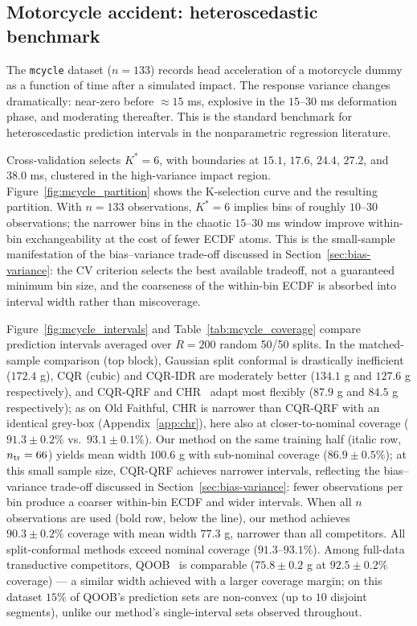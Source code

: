 \documentclass[11pt]{article}
\begin{document}
\subsection{Motorcycle accident: heteroscedastic benchmark}

The \texttt{mcycle} dataset ($n = 133$) records head acceleration of a
motorcycle dummy as a function of time after a simulated impact.
The response variance changes dramatically: near-zero before
$\approx 15$ ms, explosive in the $15$--$30$ ms deformation phase,
and moderating thereafter.
This is the standard benchmark for heteroscedastic prediction intervals
in the nonparametric regression literature.

Cross-validation selects $K^* = 6$, with boundaries at $15.1$, $17.6$,
$24.4$, $27.2$, and $38.0$ ms, clustered in the high-variance impact region.
Figure~\ref{fig:mcycle_partition} shows the K-selection curve and the
resulting partition.
With $n = 133$ observations, $K^* = 6$ implies bins of roughly
$10$--$30$ observations; the narrower bins in the chaotic $15$--$30$ ms
window improve within-bin exchangeability at the cost of fewer ECDF atoms.
This is the small-sample manifestation of the bias--variance trade-off
discussed in Section~\ref{sec:bias-variance}: the CV criterion selects
the best available tradeoff, not a guaranteed minimum bin size, and the
coarseness of the within-bin ECDF is absorbed into interval width rather
than miscoverage.

Figure~\ref{fig:mcycle_intervals} and Table~\ref{tab:mcycle_coverage}
compare prediction intervals averaged over $R=200$ random 50/50 splits.
In the matched-sample comparison (top block), Gaussian split conformal is
drastically inefficient ($172.4$ g), CQR (cubic) and CQR-IDR are moderately
better ($134.1$ g and $127.6$ g respectively), and CQR-QRF and
CHR~\citep{SesiaRomano2021} adapt most flexibly ($87.9$ g and $84.5$ g
respectively); as on Old Faithful, CHR is narrower than CQR-QRF with an
identical grey-box (Appendix~\ref{app:chr}), here also at closer-to-nominal
coverage ($91.3 \pm 0.2\%$ vs.\ $93.1 \pm 0.1\%$).
Our method on the same training half (italic row, $n_{\rm tr} = 66$)
yields mean width $100.6$ g with sub-nominal coverage ($86.9 \pm 0.5\%$);
at this small sample size, CQR-QRF achieves narrower intervals, reflecting
the bias--variance trade-off discussed in Section~\ref{sec:bias-variance}:
fewer observations per bin produce a coarser within-bin ECDF and wider intervals.
When all $n$ observations are used (bold row, below the line), our method
achieves $90.3 \pm 0.2\%$ coverage with mean width $77.3$ g, narrower than
all competitors.
All split-conformal methods exceed nominal coverage ($91.3$--$93.1\%$).
Among full-data transductive competitors, QOOB~\citep{GuptaEtAl2022} is
comparable ($75.8 \pm 0.2$ g at $92.5 \pm 0.2\%$ coverage) --- a similar width
achieved with a larger coverage margin; on this dataset $15\%$ of QOOB's
prediction sets are non-convex (up to $10$ disjoint segments), unlike our
method's single-interval sets observed throughout.
\end{document}
